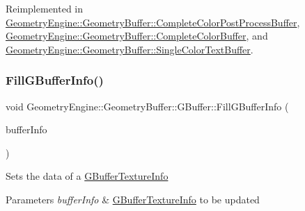 Reimplemented in \mbox{\hyperlink{class_geometry_engine_1_1_geometry_buffer_1_1_complete_color_post_process_buffer_ac7d1a90658b1a2f59674b76685e8b052}{Geometry\+Engine\+::\+Geometry\+Buffer\+::\+Complete\+Color\+Post\+Process\+Buffer}}, \mbox{\hyperlink{class_geometry_engine_1_1_geometry_buffer_1_1_complete_color_buffer_a0630be352a9267083d42802fb22ae36b}{Geometry\+Engine\+::\+Geometry\+Buffer\+::\+Complete\+Color\+Buffer}}, and \mbox{\hyperlink{class_geometry_engine_1_1_geometry_buffer_1_1_single_color_text_buffer_a6e266272638dd67cec7b6d57f172eae2}{Geometry\+Engine\+::\+Geometry\+Buffer\+::\+Single\+Color\+Text\+Buffer}}.

\mbox{\label{class_geometry_engine_1_1_geometry_buffer_1_1_g_buffer_ad1242e69d277b69b58497f7d489e176c}} 
\subsubsection{\texorpdfstring{FillGBufferInfo()}{FillGBufferInfo()}}
{\footnotesize\ttfamily void Geometry\+Engine\+::\+Geometry\+Buffer\+::\+G\+Buffer\+::\+Fill\+G\+Buffer\+Info (\begin{DoxyParamCaption}\item[{\mbox{\hyperlink{class_geometry_engine_1_1_g_buffer_texture_info}{G\+Buffer\+Texture\+Info}} \&}]{buffer\+Info }\end{DoxyParamCaption})}

Sets the data of a \mbox{\hyperlink{class_geometry_engine_1_1_g_buffer_texture_info}{G\+Buffer\+Texture\+Info}} 
\begin{DoxyParams}{Parameters}
{\em buffer\+Info} & \mbox{\hyperlink{class_geometry_engine_1_1_g_buffer_texture_info}{G\+Buffer\+Texture\+Info}} to be updated \\
\hline
\end{DoxyParams}
\mbox{\label{class_geometry_engine_1_1_geometry_buffer_1_1_g_buffer_a47bda4849000d2728538de4e2f27f11a}} 
